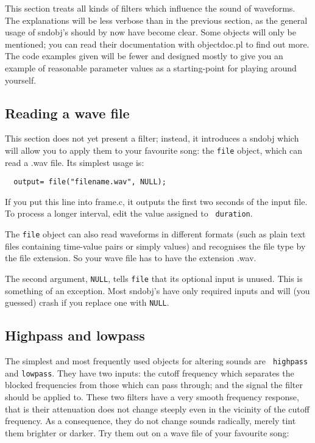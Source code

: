 \documentclass{article}
\def\bv{\begin{verbatim}}
\begin{document}
This section treats all kinds of filters which influence the sound of
waveforms.  The explanations will be less verbose than in the previous section,
as the general usage of sndobj's should by now have become clear.  Some objects
will only be mentioned; you can read their documentation with objectdoc.pl to
find out more.  The code examples given will be fewer and designed mostly to
give you an example of reasonable parameter values as a starting-point for
playing around yourself.

\subsection{Reading a wave file}

This section does not yet present a filter; instead, it introduces a sndobj
which will allow you to apply them to your favourite song: the {\tt file}
object, which can read a .wav file.  Its simplest usage is:

\bv
  output= file("filename.wav", NULL);
\end{verbatim}

If you put this line into frame.c, it outputs the first two seconds of the
input file.  To process a longer interval, edit the value assigned to {\tt
duration}.

The {\tt file} object can also read waveforms in different formats (such as
plain text files containing time-value pairs or simply values) and recognises
the file type by the file extension.  So your wave file has to have the
extension .wav.

The second argument, {\tt NULL}, tells {\tt file} that its optional input is
unused.  This is something of an exception.  Most sndobj's have only required
inputs and will (you  guessed) crash if you replace one  with {\tt NULL}.


\subsection{Highpass and lowpass}

The simplest and most frequently used objects for altering sounds are {\tt
highpass} and {\tt lowpass}.  They have two inputs: the cutoff frequency which
separates the blocked frequencies from those which can pass through; and the 
signal the filter should be applied to.  These two filters have a very smooth
frequency response, that is their attenuation does not change steeply even in
the vicinity of the cutoff frequency.  As a consequence, they do not change
sounds radically, merely tint them brighter or darker.  Try them out on a wave
file of your favourite song:
\end{document}
